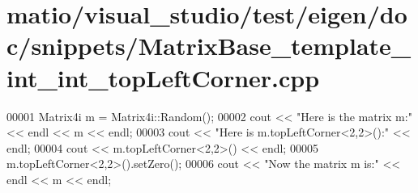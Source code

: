 \hypertarget{matio_2visual__studio_2test_2eigen_2doc_2snippets_2_matrix_base__template__int__int__top_left_corner_8cpp_source}{}\section{matio/visual\+\_\+studio/test/eigen/doc/snippets/\+Matrix\+Base\+\_\+template\+\_\+int\+\_\+int\+\_\+top\+Left\+Corner.cpp}
\label{matio_2visual__studio_2test_2eigen_2doc_2snippets_2_matrix_base__template__int__int__top_left_corner_8cpp_source}

\begin{DoxyCode}
00001 Matrix4i m = Matrix4i::Random();
00002 cout << \textcolor{stringliteral}{"Here is the matrix m:"} << endl << m << endl;
00003 cout << \textcolor{stringliteral}{"Here is m.topLeftCorner<2,2>():"} << endl;
00004 cout << m.topLeftCorner<2,2>() << endl;
00005 m.topLeftCorner<2,2>().setZero();
00006 cout << \textcolor{stringliteral}{"Now the matrix m is:"} << endl << m << endl;
\end{DoxyCode}
